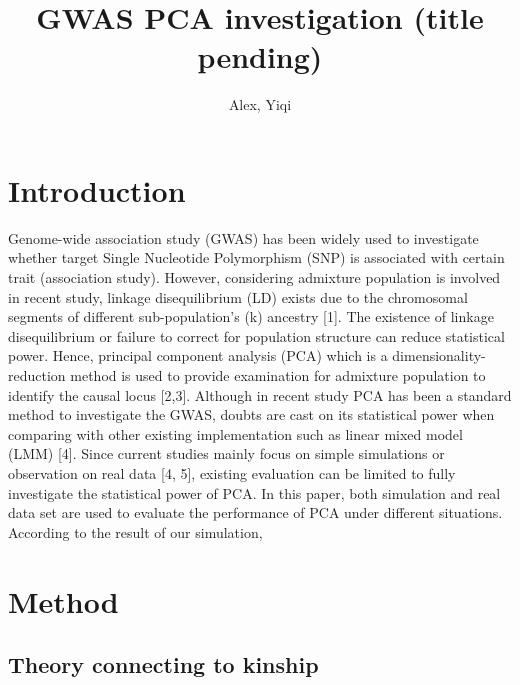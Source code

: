 \documentclass[12pt]{article}
\title{GWAS PCA investigation (title pending)}
\author{Alex, Yiqi }
\theoremstyle{definition}
\theoremstyle{plain}
\begin{document}
	\maketitle
	
	
\section{Introduction} 

Genome-wide association study (GWAS) has been widely used to investigate whether target Single Nucleotide Polymorphism (SNP) is associated with certain trait (association study). However, considering admixture population is involved in recent study, linkage disequilibrium (LD) exists due to the chromosomal segments of different sub-population's (k) ancestry [1]. The existence of linkage disequilibrium or failure to correct for population structure can reduce statistical power. Hence, principal component analysis (PCA) which is a dimensionality-reduction method is used to provide examination for admixture population to identify the causal locus [2,3]. Although in recent study PCA has been a standard method to investigate the GWAS, doubts are cast on its statistical power when comparing with other existing implementation such as linear mixed model (LMM) [4]. Since current studies mainly focus on simple simulations or observation on real data [4, 5], existing evaluation can be limited to fully investigate the statistical power of PCA. In this paper, both simulation and real data set are used to evaluate the performance of PCA under different situations.\\

According to the result of our simulation, 

\section{Method} 
\subsection{Theory connecting to kinship}
\end{document}
